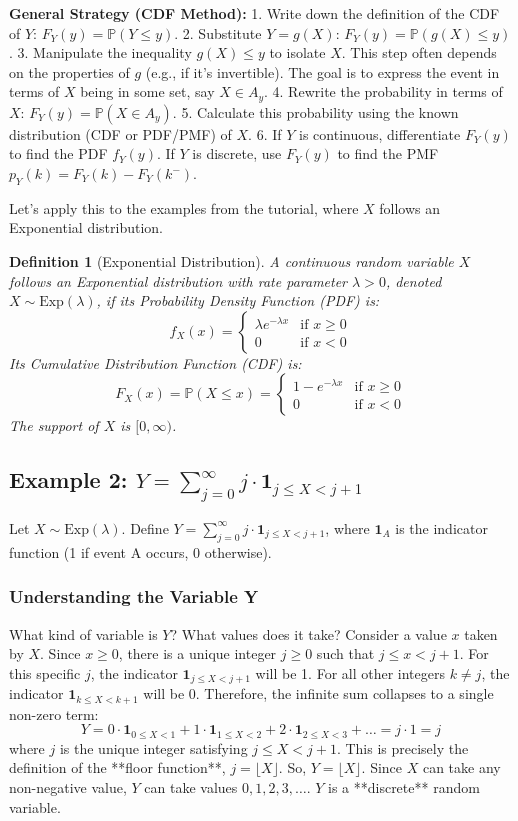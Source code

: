 \documentclass[11pt]{article}
\theoremstyle{mytheoremstyle}
\theoremstyle{mydefinitionstyle}
\newtheorem{definition}[theorem]{Definition}
\newcommand{\indicator}[1]{\mathbf{1}_{#1}}
\newcommand{\Prob}{\mathbb{P}} %
\begin{document}
\textbf{General Strategy (CDF Method):}
1.  Write down the definition of the CDF of $Y$: $F_Y(y) = \Prob(Y \le y)$.
2.  Substitute $Y=g(X)$: $F_Y(y) = \Prob(g(X) \le y)$.
3.  Manipulate the inequality $g(X) \le y$ to isolate $X$. This step often depends on the properties of $g$ (e.g., if it's invertible). The goal is to express the event in terms of $X$ being in some set, say $X \in A_y$.
4.  Rewrite the probability in terms of $X$: $F_Y(y) = \Prob(X \in A_y)$.
5.  Calculate this probability using the known distribution (CDF or PDF/PMF) of $X$.
6.  If $Y$ is continuous, differentiate $F_Y(y)$ to find the PDF $f_Y(y)$. If $Y$ is discrete, use $F_Y(y)$ to find the PMF $p_Y(k) = F_Y(k) - F_Y(k^-)$.

Let's apply this to the examples from the tutorial, where $X$ follows an Exponential distribution.

\begin{definition}[Exponential Distribution]
A continuous random variable $X$ follows an Exponential distribution with rate parameter $\lambda > 0$, denoted $X \sim \text{Exp}(\lambda)$, if its Probability Density Function (PDF) is:
\[ f_X(x) = \begin{cases} \lambda e^{-\lambda x} & \text{if } x \ge 0 \\ 0 & \text{if } x < 0 \end{cases} \]
Its Cumulative Distribution Function (CDF) is:
\[ F_X(x) = \Prob(X \le x) = \begin{cases} 1 - e^{-\lambda x} & \text{if } x \ge 0 \\ 0 & \text{if } x < 0 \end{cases} \]
The support of $X$ is $[0, \infty)$.
\end{definition}

\subsection{Example 2: $Y = \sum_{j=0}^{\infty} j \cdot \indicator{j \le X < j+1}$}

Let $X \sim \text{Exp}(\lambda)$. Define $Y = \sum_{j=0}^{\infty} j \cdot \indicator{j \le X < j+1}$, where $\indicator{A}$ is the indicator function (1 if event A occurs, 0 otherwise).

\subsubsection{Understanding the Variable Y}
What kind of variable is $Y$? What values does it take?
Consider a value $x$ taken by $X$. Since $x \ge 0$, there is a unique integer $j \ge 0$ such that $j \le x < j+1$. For this specific $j$, the indicator $\indicator{j \le X < j+1}$ will be 1. For all other integers $k \ne j$, the indicator $\indicator{k \le X < k+1}$ will be 0.
Therefore, the infinite sum collapses to a single non-zero term:
\[ Y = 0 \cdot \indicator{0 \le X < 1} + 1 \cdot \indicator{1 \le X < 2} + 2 \cdot \indicator{2 \le X < 3} + \dots = j \cdot 1 = j \]
where $j$ is the unique integer satisfying $j \le X < j+1$. This is precisely the definition of the **floor function**, $j = \lfloor X \rfloor$.
So, $Y = \lfloor X \rfloor$.
Since $X$ can take any non-negative value, $Y$ can take values $0, 1, 2, 3, \dots$. $Y$ is a **discrete** random variable.
\end{document}
